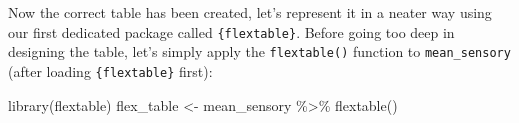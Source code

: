 \documentclass[
]{krantz}
\makeatletter
\newenvironment{Shaded}{\begin{snugshade}}{\end{snugshade}}
\newcommand{\FunctionTok}[1]{\textcolor[rgb]{0,0,0}{#1}}
\newcommand{\NormalTok}[1]{#1}
\newcommand{\OtherTok}[1]{\textcolor[rgb]{0.37,0.37,0.37}{#1}}
\newcommand{\SpecialCharTok}[1]{\textcolor[rgb]{0,0,0}{#1}}
\newenvironment{kframe}{%
\medskip{}
\setlength{\fboxsep}{.8em}
 \def\at@end@of@kframe{}%
 \ifinner\ifhmode%
  \def\at@end@of@kframe{\end{minipage}}%
  \begin{minipage}{\columnwidth}%
 \fi\fi%
 \def\FrameCommand##1{\hskip\@totalleftmargin \hskip-\fboxsep
 \colorbox{shadecolor}{##1}\hskip-\fboxsep
     \hskip-\linewidth \hskip-\@totalleftmargin \hskip\columnwidth}%
 \MakeFramed {\advance\hsize-\width
   \@totalleftmargin\z@ \linewidth\hsize
   \@setminipage}}%
 {\par\unskip\endMakeFramed%
 \at@end@of@kframe}
\renewenvironment{Shaded}{\begin{kframe}}{\end{kframe}}
\makeatother
\begin{document}
Now the correct table has been created, let's represent it in a neater way using our first dedicated package called \texttt{\{flextable\}}. Before going too deep in designing the table, let's simply apply the \texttt{flextable()} function to \texttt{mean\_sensory} (after loading \texttt{\{flextable\}} first):

\begin{Shaded}
\begin{Highlighting}[]
\FunctionTok{library}\NormalTok{(flextable)  }
\NormalTok{flex\_table }\OtherTok{\textless{}{-}}\NormalTok{ mean\_sensory }\SpecialCharTok{\%\textgreater{}\%} 
  \FunctionTok{flextable}\NormalTok{()}
\end{Highlighting}
\end{Shaded}

\providecommand{\docline}[3]{\noalign{\global\setlength{\arrayrulewidth}{#1}}\arrayrulecolor[HTML]{#2}\cline{#3}}

\setlength{\tabcolsep}{0pt}

\renewcommand*{\arraystretch}{1.5}
\end{document}
